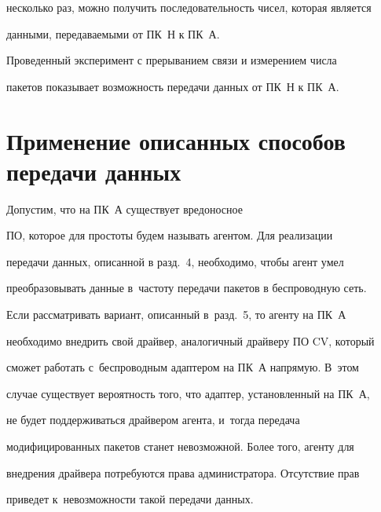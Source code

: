 несколько раз, можно получить последовательность чисел, которая является


данными, передаваемыми от ПК~Н к ПК~А.





  Проведенный эксперимент с прерыванием связи и измерением числа


пакетов показывает возможность передачи данных от ПК~Н к ПК~А.





\vspace*{-4pt}





\section{Применение описанных способов передачи данных}





\vspace*{-2pt}





  Допустим, что на ПК~А существует вредоносное


ПО, которое для простоты будем называть агентом. Для реализации


передачи данных, описанной в разд.~4, необходимо, чтобы агент умел


преобразовывать данные в~час\-то\-ту передачи пакетов в беспроводную сеть.


Если рассматривать вариант, описанный в~разд.~5, то агенту на ПК~А


необходимо внедрить свой драйвер, аналогичный драйверу ПО CV, который


сможет работать с~беспроводным адап\-те\-ром на ПК~А напрямую. В~этом


случае существует вероятность того, что адаптер, установленный на ПК~А,


не будет поддерживаться драйвером агента, и~тогда передача


модифицированных пакетов станет невозможной. Более того, агенту для


внедрения драйвера потребуются права администратора. Отсутствие прав


приведет к~невозможности такой передачи данных.





